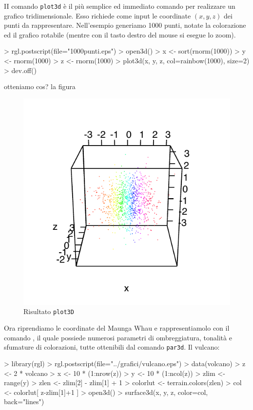 \documentclass[onecolumn,11pt]{book}
\begin{document}
II comando \texttt{plot3d} \`e  il pi\`u semplice ed immediato comando per realizzare un grafico tridimensionale. Esso richiede come input le coordinate $(x,y,z)$ dei punti da rappresentare.
Nell'esempio generiamo 1000 punti, notate la colorazione ed il grafico rotabile (mentre con il tasto destro del mouse si esegue lo zoom).
\begin{Schunk}
\begin{Sinput}
> rgl.postscript(file="1000punti.eps")
> open3d()
> x <- sort(rnorm(1000))
> y <- rnorm(1000)
> z <- rnorm(1000)
> plot3d(x, y, z, col=rainbow(1000), size=2)
> dev.off()
\end{Sinput}
\end{Schunk}
otteniamo cos? la figura
\begin{figure}[htbp]
\begin{center}
\includegraphics[scale=0.8]{../grafici/1000punti.pdf}
\caption{Risultato \texttt{plot3D}}
\label{defaue}
\end{center}
\end{figure}

Ora riprendiamo le coordinate del Maunga Whau e rappresentiamolo con il comando , il quale possiede numerosi parametri di ombreggiatura, tonalit\`a e sfumature di colorazioni, tutte ottenibili dal comando \texttt{par3d}. Il vulcano:
\begin{Schunk}
\begin{Sinput}
> library(rgl)
> rgl.postscript(file="../grafici/vulcano.eps")
> data(volcano)
> z <- 2 * volcano
> x <- 10 * (1:nrow(z))
> y <- 10 * (1:ncol(z))
> zlim <- range(y)
> zlen <- zlim[2] - zlim[1] + 1
> colorlut <- terrain.colors(zlen)
> col <- colorlut[ z-zlim[1]+1 ]
> open3d()
> surface3d(x, y, z, color=col, back="lines")
\end{Sinput}
\end{Schunk}
\end{document}
